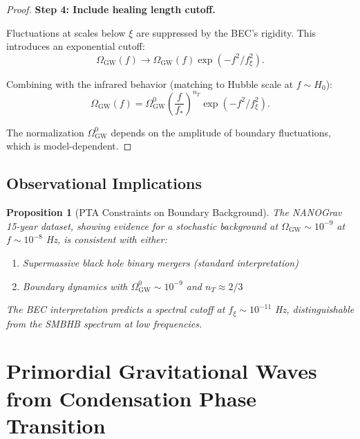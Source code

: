 \documentclass[11pt,a4paper]{article}
\newtheorem{proposition}[theorem]{Proposition}
\theoremstyle{definition}
\theoremstyle{remark}
\begin{document}
\begin{proof}
\textbf{Step 4: Include healing length cutoff.}

Fluctuations at scales below $\xi$ are suppressed by the BEC's rigidity. This introduces an exponential cutoff:
\begin{equation}
\Omega_{\mathrm{GW}}(f) \to \Omega_{\mathrm{GW}}(f)\exp(-f^2/f_\xi^2).
\end{equation}

Combining with the infrared behavior (matching to Hubble scale at $f \sim H_0$):
\begin{equation}
\Omega_{\mathrm{GW}}(f) = \Omega_{\mathrm{GW}}^0 \left(\frac{f}{f_*}\right)^{n_T}\exp(-f^2/f_\xi^2).
\end{equation}

The normalization $\Omega_{\mathrm{GW}}^0$ depends on the amplitude of boundary fluctuations, which is model-dependent. \qedhere
\end{proof}

\subsection{Observational Implications}
\label{sec:stochastic_observations}

\begin{proposition}[PTA Constraints on Boundary Background]
\label{prop:pta_boundary}
The NANOGrav 15-year dataset, showing evidence for a stochastic background at $\Omega_{\mathrm{GW}} \sim 10^{-9}$ at $f \sim 10^{-8}$ Hz, is consistent with either:
\begin{enumerate}[label=(\alph*)]
\item Supermassive black hole binary mergers (standard interpretation)
\item Boundary dynamics with $\Omega_{\mathrm{GW}}^0 \sim 10^{-9}$ and $n_T \approx 2/3$
\end{enumerate}
The BEC interpretation predicts a spectral cutoff at $f_\xi \sim 10^{-11}$ Hz, distinguishable from the SMBHB spectrum at low frequencies.
\end{proposition}

\section{Primordial Gravitational Waves from Condensation Phase Transition}
\label{sec:primordial_gw}
\end{document}
